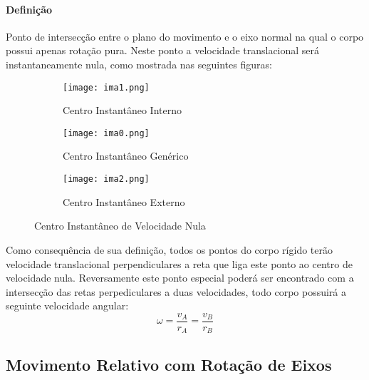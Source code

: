 \documentclass{article}
\begin{document}
            \paragraph{Definição}Ponto de intersecção entre o plano do movimento e o eixo normal na qual o corpo possui apenas rotação pura. Neste ponto a velocidade translacional será instantaneamente nula, como mostrada nas seguintes figuras:
                \begin{figure}[H]
                    \centering
                    \begin{subfigure}[]{0.3\textwidth}
                        \centering
                        \texttt{[image: ima1.png]}
                        \caption{Centro Instantâneo Interno}
                    \end{subfigure}
                    \begin{subfigure}[]{0.3\textwidth}
                        \centering
                        \texttt{[image: ima0.png]}
                        \caption{Centro Instantâneo Genérico}
                    \end{subfigure}
                    \begin{subfigure}[]{0.3\textwidth}
                        \centering
                        \texttt{[image: ima2.png]}
                        \caption{Centro Instantâneo Externo}
                    \end{subfigure}
                    \caption{Centro Instantâneo de Velocidade Nula}
                \end{figure} \noindent
            Como consequência de sua definição, todos os pontos do corpo rígido terão velocidade translacional perpendiculares a reta que liga este ponto ao centro de velocidade nula. Reversamente este ponto especial poderá ser encontrado com a intersecção das retas perpediculares a duas velocidades, todo corpo possuirá a seguinte velocidade angular:
                \begin{equation}
                    \boxed{
                        \omega = 
                        \frac{v_{A}}{r_{A}} =
                        \frac{v_{B}}{r_{B}}
                    }
                \end{equation}

        \subsection{Movimento Relativo com Rotação de Eixos}
\end{document}

